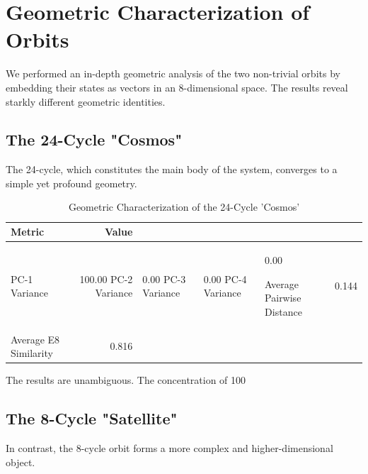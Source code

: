 \documentclass{article}
\begin{document}
\section{Geometric Characterization of Orbits}
We performed an in-depth geometric analysis of the two non-trivial orbits by embedding their states as vectors in an 8-dimensional space. The results reveal starkly different geometric identities.

\subsection{The 24-Cycle "Cosmos"}
The 24-cycle, which constitutes the main body of the system, converges to a simple yet profound geometry.

\begin{table}[h!]
    \centering
    \caption{Geometric Characterization of the 24-Cycle 'Cosmos'}
    \label{tab:geometric_characterization_of_the_24-cycle_'cosmos'}
    \begin{tabular}{l r}
        \hline
        \textbf{Metric} & \textbf{Value} \\
        \hline
        PC-1 Variance & 100.00%
        PC-2 Variance & 0.00%
        PC-3 Variance & 0.00%
        PC-4 Variance & 0.00%

        Average Pairwise Distance & 0.144 \\
        Average E8 Similarity & 0.816 \\
        \hline
    \end{tabular}
\end{table}

The results are unambiguous. The concentration of 100%

\subsection{The 8-Cycle "Satellite"}
In contrast, the 8-cycle orbit forms a more complex and higher-dimensional object.
\end{document}
